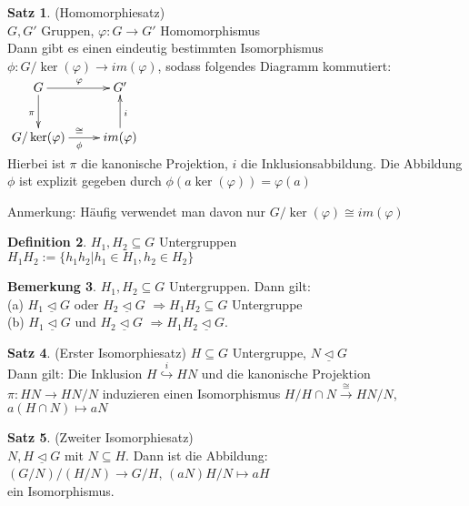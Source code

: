 \documentclass[10pt,a4paper,numbers=endperiod]{scrreprt}
\theoremstyle{definition}
\newtheorem{satz}{Satz}[section]
\newtheorem{defi}[satz]{Definition}
\newtheorem{bem}[satz]{Bemerkung}
\begin{document}
\begin{satz}
	(Homomorphiesatz)\\
	$G, G'$ Gruppen, $\varphi: G \rightarrow G'$ Homomorphismus\\
	Dann gibt es einen eindeutig bestimmten Isomorphismus $\phi: G/\ker(\varphi) \rightarrow im(\varphi)$, sodass folgendes Diagramm kommutiert:\\
	$\begin{xy}
	\xymatrix{
		G \ar[r]^{\varphi} \ar[d]_\pi    &   G'  \\
		G/\ker(\varphi) \ar[r]_{\phi}^{\cong} &   im(\varphi) \ar[u]_i
	}
	\end{xy}$\\
	Hierbei ist $\pi$ die kanonische Projektion, $i$ die Inklusionsabbildung. Die Abbildung $\phi$ ist explizit gegeben durch $\phi(a \ker(\varphi)) = \varphi(a)$
\end{satz}

Anmerkung: Häufig verwendet man davon nur $G/\ker(\varphi) \cong im(\varphi)$

\begin{defi}
	$H_1, H_2 \subseteq G$ Untergruppen\\
	$H_1H_2 := \{h_1h_2| h_1 \in H_1, h_2 \in H_2\}$
\end{defi}

\begin{bem}
	$H_1, H_2 \subseteq G$ Untergruppen. Dann gilt:\\
	(a) $H_1 \underline{\vartriangleleft} G$ oder $H_2 \underline{\vartriangleleft} G$ $\Rightarrow H_1H_2 \subseteq G$ Untergruppe\\
	(b) $H_1 \underline{\vartriangleleft} G$ und $H_2 \underline{\vartriangleleft} G$ $\Rightarrow H_1H_2 \underline{\vartriangleleft} G$.
\end{bem}

\begin{satz}
	(Erster Isomorphiesatz)
	$H \subseteq G$ Untergruppe, $N \underline{\vartriangleleft} G$\\
	Dann gilt: Die Inklusion $H \overset{i}{\hookrightarrow} HN$ und die kanonische Projektion $\pi: HN \rightarrow HN/N$ induzieren einen Isomorphismus $H/H\cap N \overset{\cong}{\longrightarrow} HN/N$, $a(H \cap N) \mapsto aN$\\
\end{satz}

\begin{satz}
	(Zweiter Isomorphiesatz)\\
	$N, H \underline{\vartriangleleft} G$ mit $N \subseteq H$. Dann ist die Abbildung:\\
	
	$(G/N)/(H/N) \rightarrow G/H$, $(aN) H/N \mapsto aH$\\
	ein Isomorphismus.
\end{satz}
\end{document}
